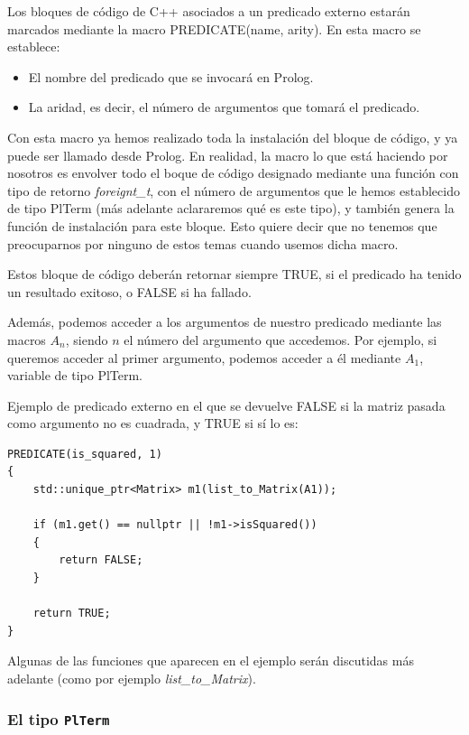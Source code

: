 \documentclass[a4paper]{article}
\begin{document}
Los bloques de código de C++ asociados a un predicado externo estarán marcados mediante la macro PREDICATE(name, arity). En esta macro se establece:

\begin{itemize}
\item El nombre del predicado que se invocará en Prolog.
\item La aridad, es decir, el número de argumentos que tomará el predicado.
\end{itemize}

Con esta macro ya hemos realizado toda la instalación del bloque de código, y ya puede ser llamado desde Prolog. En realidad, la macro lo que está haciendo por nosotros es envolver todo el boque de código designado mediante una función con tipo de retorno \textit{foreignt\_t}, con el número de argumentos que le hemos establecido de tipo PlTerm (más adelante aclararemos qué es este tipo), y también genera la función de instalación para este bloque. Esto quiere decir que no tenemos que preocuparnos por ninguno de estos temas cuando usemos dicha macro.

Estos bloque de código deberán retornar siempre TRUE, si el predicado ha tenido un resultado exitoso, o FALSE si ha fallado.

Además, podemos acceder a los argumentos de nuestro predicado mediante las macros $A_n$, siendo $n$ el número del argumento que accedemos. Por ejemplo, si queremos acceder al primer argumento, podemos acceder a él mediante $A_1$, variable de tipo PlTerm.

Ejemplo de predicado externo en el que se devuelve FALSE si la matriz pasada como argumento no es cuadrada, y TRUE si sí lo es:

\begin{lstlisting}[style=C++]
PREDICATE(is_squared, 1)
{
	std::unique_ptr<Matrix> m1(list_to_Matrix(A1));
	
	if (m1.get() == nullptr || !m1->isSquared())
	{
		return FALSE;
	}
	
	return TRUE;
}
\end{lstlisting}

Algunas de las funciones que aparecen en el ejemplo serán discutidas más adelante (como por ejemplo \textit{list\_to\_Matrix}).

\subsubsection{El tipo \texttt{PlTerm}}
\end{document}
